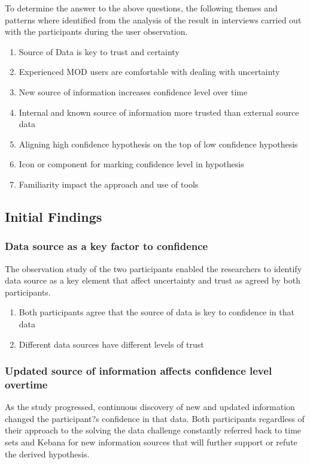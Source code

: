 \documentclass[journal]{vgtc}                %
\begin{document}
To determine the answer to the above questions, the following themes and patterns where identified from the analysis of the result in interviews carried out with the participants during the user observation.

\begin{enumerate}
  \item Source of Data is key to trust and certainty
  \item Experienced MOD users are comfortable with dealing with uncertainty
  \item New source of information increases confidence level over time
  \item Internal and known source of information more trusted than external source data
  \item Aligning high confidence hypothesis on the top of low confidence hypothesis
  \item Icon or component for marking confidence level in hypothesis
  \item Familiarity impact the approach and use of tools
\end{enumerate}

\subsection{Initial Findings}
\subsubsection{Data source as a key factor to confidence}
The observation study of the two participants enabled the researchers to identify data source as a key element that affect uncertainty and trust as agreed by both participants. 
\begin{enumerate}
  \item Both participants agree that the source of data is key to confidence in that data
  \item Different data sources have different levels of trust 
\end{enumerate}

\subsubsection{Updated source of information affects confidence level overtime}
As the study progressed, continuous discovery of new and updated information changed the participant?s confidence in that data. Both participants regardless of their approach to the solving the data challenge constantly referred back to time sets and Kebana for new information sources that will further support or refute the derived hypothesis.
\end{document}
